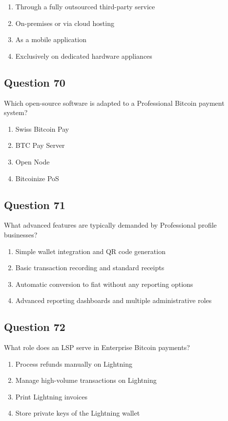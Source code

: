 \documentclass[12pt,a4paper]{article}
\begin{document}
\begin{enumerate}[label=\Alph*., leftmargin=*]
\item Through a fully outsourced third-party service
\item On-premises or via cloud hosting
\item As a mobile application
\item Exclusively on dedicated hardware appliances
\end{enumerate}

\bigskip


\subsection*{Question 70}
Which open-source software is adapted to a Professional Bitcoin payment system?

\begin{enumerate}[label=\Alph*., leftmargin=*]
\item Swiss Bitcoin Pay
\item BTC Pay Server
\item Open Node
\item Bitcoinize PoS
\end{enumerate}

\bigskip


\subsection*{Question 71}
What advanced features are typically demanded by Professional profile businesses?

\begin{enumerate}[label=\Alph*., leftmargin=*]
\item Simple wallet integration and QR code generation
\item Basic transaction recording and standard receipts
\item Automatic conversion to fiat without any reporting options
\item Advanced reporting dashboards and multiple administrative roles
\end{enumerate}

\bigskip


\subsection*{Question 72}
What role does an LSP serve in Enterprise Bitcoin payments?

\begin{enumerate}[label=\Alph*., leftmargin=*]
\item Process refunds manually on Lightning
\item Manage high-volume transactions on Lightning
\item Print Lightning invoices
\item Store private keys of the Lightning wallet
\end{enumerate}
\end{document}
